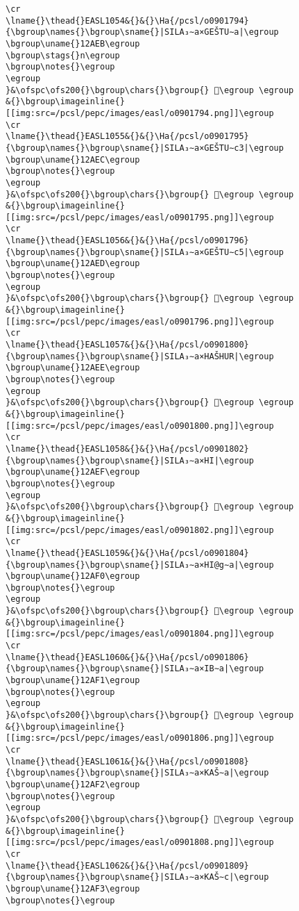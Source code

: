 \begin{verbatim}
\cr
\lname{}\thead{}EASL1054&{}&{}\Ha{/pcsl/o0901794}{\bgroup\names{}\bgroup\sname{}|SILA₃∼a×GEŠTU∼a|\egroup
\bgroup\uname{}12AEB\egroup
\bgroup\stags{}n\egroup
\bgroup\notes{}\egroup
\egroup
}&\ofspc\ofs200{}\bgroup\chars{}\bgroup{} 𒫫\egroup \egroup
&{}\bgroup\imageinline{}[[img:src=/pcsl/pepc/images/easl/o0901794.png]]\egroup
\cr
\lname{}\thead{}EASL1055&{}&{}\Ha{/pcsl/o0901795}{\bgroup\names{}\bgroup\sname{}|SILA₃∼a×GEŠTU∼c3|\egroup
\bgroup\uname{}12AEC\egroup
\bgroup\notes{}\egroup
\egroup
}&\ofspc\ofs200{}\bgroup\chars{}\bgroup{} 𒫬\egroup \egroup
&{}\bgroup\imageinline{}[[img:src=/pcsl/pepc/images/easl/o0901795.png]]\egroup
\cr
\lname{}\thead{}EASL1056&{}&{}\Ha{/pcsl/o0901796}{\bgroup\names{}\bgroup\sname{}|SILA₃∼a×GEŠTU∼c5|\egroup
\bgroup\uname{}12AED\egroup
\bgroup\notes{}\egroup
\egroup
}&\ofspc\ofs200{}\bgroup\chars{}\bgroup{} 𒫭\egroup \egroup
&{}\bgroup\imageinline{}[[img:src=/pcsl/pepc/images/easl/o0901796.png]]\egroup
\cr
\lname{}\thead{}EASL1057&{}&{}\Ha{/pcsl/o0901800}{\bgroup\names{}\bgroup\sname{}|SILA₃∼a×HAŠHUR|\egroup
\bgroup\uname{}12AEE\egroup
\bgroup\notes{}\egroup
\egroup
}&\ofspc\ofs200{}\bgroup\chars{}\bgroup{} 𒫮\egroup \egroup
&{}\bgroup\imageinline{}[[img:src=/pcsl/pepc/images/easl/o0901800.png]]\egroup
\cr
\lname{}\thead{}EASL1058&{}&{}\Ha{/pcsl/o0901802}{\bgroup\names{}\bgroup\sname{}|SILA₃∼a×HI|\egroup
\bgroup\uname{}12AEF\egroup
\bgroup\notes{}\egroup
\egroup
}&\ofspc\ofs200{}\bgroup\chars{}\bgroup{} 𒫯\egroup \egroup
&{}\bgroup\imageinline{}[[img:src=/pcsl/pepc/images/easl/o0901802.png]]\egroup
\cr
\lname{}\thead{}EASL1059&{}&{}\Ha{/pcsl/o0901804}{\bgroup\names{}\bgroup\sname{}|SILA₃∼a×HI@g∼a|\egroup
\bgroup\uname{}12AF0\egroup
\bgroup\notes{}\egroup
\egroup
}&\ofspc\ofs200{}\bgroup\chars{}\bgroup{} 𒫰\egroup \egroup
&{}\bgroup\imageinline{}[[img:src=/pcsl/pepc/images/easl/o0901804.png]]\egroup
\cr
\lname{}\thead{}EASL1060&{}&{}\Ha{/pcsl/o0901806}{\bgroup\names{}\bgroup\sname{}|SILA₃∼a×IB∼a|\egroup
\bgroup\uname{}12AF1\egroup
\bgroup\notes{}\egroup
\egroup
}&\ofspc\ofs200{}\bgroup\chars{}\bgroup{} 𒫱\egroup \egroup
&{}\bgroup\imageinline{}[[img:src=/pcsl/pepc/images/easl/o0901806.png]]\egroup
\cr
\lname{}\thead{}EASL1061&{}&{}\Ha{/pcsl/o0901808}{\bgroup\names{}\bgroup\sname{}|SILA₃∼a×KAŠ∼a|\egroup
\bgroup\uname{}12AF2\egroup
\bgroup\notes{}\egroup
\egroup
}&\ofspc\ofs200{}\bgroup\chars{}\bgroup{} 𒫲\egroup \egroup
&{}\bgroup\imageinline{}[[img:src=/pcsl/pepc/images/easl/o0901808.png]]\egroup
\cr
\lname{}\thead{}EASL1062&{}&{}\Ha{/pcsl/o0901809}{\bgroup\names{}\bgroup\sname{}|SILA₃∼a×KAŠ∼c|\egroup
\bgroup\uname{}12AF3\egroup
\bgroup\notes{}\egroup

\end{verbatim}
